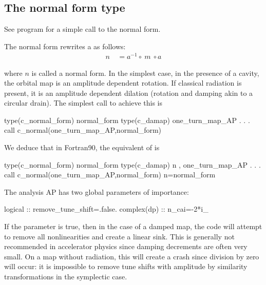 \documentclass{hitec}     %
\def\tc{http://www.takafumi.org/etienne/new_pages/programs/}
\begin{document}
{{{{{{{{{{{{{{{{{{  
  \subsection{ The normal form type}\label{s:normalform}
  
  See program \href{\tc z_track_normal_tpsa.f90}{}    for a simple call to the normal form.

  
  The normal form rewrites a  as follows:
%
\begin{align} n\ &={a}^{-1}\circ \ m\ \circ a \label{eq:normalf}\end{align}

where $n$ is called a normal form. In the simplest case, in the presence of a cavity, the orbital map is an amplitude dependent rotation. If classical radiation is present, it is an amplitude dependent dilation (rotation and damping akin to a circular drain).  The simplest call to achieve this is

\begin{code}
type(c_normal_form) normal_form
type(c_damap)  one_turn_map_AP
	.
	.
	.
call c_normal(one_turn_map_AP,normal_form)
\end{code}

We deduce that in Fortran90,   the equivalent of  is 
\begin{code}
type(c_normal_form) normal_form
type(c_damap) n , one_turn_map_AP
	.
	.
	.
call c_normal(one_turn_map_AP,normal_form)
n=normal_form%
\end{code}


The analysis AP has two global parameters of importance:

\begin{code}
logical :: remove_tune_shift=.false.
complex(dp) :: n_cai=-2*i_
\end{code}
  
If the parameter   is true, then in the case of a damped map, the code will attempt to remove all nonlinearities and create a linear sink. This is generally not recommended in accelerator physics since damping decrements are often very small. On a map without radiation, this will create a crash since division by zero will occur: it is impossible to remove tune shifts with amplitude by similarity transformations in the symplectic case.

}}}}}}}}}}}}}}}}}}
\end{document}
